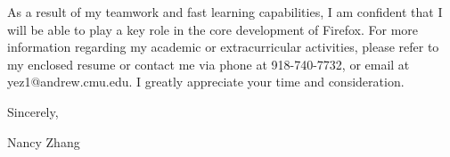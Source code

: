 \documentclass[11pt,letterpaper]{article}
\begin{document}
As a result of my teamwork and fast learning capabilities, I am confident that I will be able to play a key role in the core development of Firefox. For more information regarding my academic or extracurricular activities, please refer to my enclosed resume or contact me via phone at 918-740-7732, or email at yez1@andrew.cmu.edu. I greatly appreciate your time and consideration.

\vspace*{1em}
\noindent Sincerely,

\vspace*{2em}
\noindent Nancy Zhang
\end{document}
